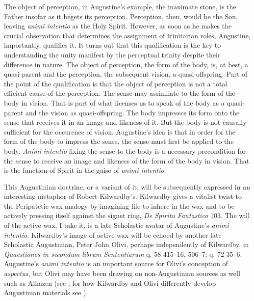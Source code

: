 \documentclass[12pt]{article}
\begin{document}
The object of perception, in Augustine's example, the inanimate stone, is the Father insofar as it begets its perception. Perception, then, would be the Son, leaving \emph{animi intentio} as the Holy Spirit. However, as soon as he makes the crucial observation that determines the assignment of trinitarian roles, Augustine, importantly, qualifies it. It turns out that this qualification is the key to understanding the unity manifest by the perceptual trinity despite their difference in nature. The object of perception, the form of the body, is, at best, a quasi-parent and the perception, the subsequent vision, a quasi-offspring. Part of the point of the qualification is that the object of perception is not a total efficient cause of the perception. The sense may assimilate to the form of the body in vision. That is part of what licenses us to speak of the body as a quasi-parent and the vision as quasi-offspring. The body impresses its form onto the sense that receives it in an image and likeness of it. But the body is not causally sufficient for the occurence of vision. Augustine's idea is that in order for the form of the body to impress the sense, the sense must first be applied to the body. \emph{Animi intentio} fixing the sense to the body is a necessary precondition for the sense to receive an image and likeness of the form of the body in vision. That is the function of Spirit in the guise of \emph{animi intentio}. 

This Augustinian doctrine, or a variant of it, will be subsequently expressed in an interesting metaphor of Robert Kilwardby's. Kilwardby gives a vitalist twist to the Peripatetic wax analogy by imagining life to inhere in the wax and to be actively pressing itself against the signet ring, \emph{De Spiritu Fantastico} 103. The will of the active wax, I take it, is a late Scholastic avatar of Augustine's \emph{animi intentio}. Kilwardby's image of active wax will be echoed by another late Scholastic Augustinian, Peter John Olivi, perhaps independently of Kilwardby, in \emph{Quaestiones in secondum librum Sententiarum} q. 58 415–16, 506–7; q. 72 35–6. Augustine's \emph{animi intentio} is an important source for Olivi's conception of \emph{aspectus}, but Olivi may have been drawing on non-Augustinian sources as well such as Alhazen (see \citealt[41 especially n. 43]{Tachau:1988aa}; for how Kilwardby and Olivi differently develop Augustinian materials see \citealt{Silva:2010zh}). 
\end{document}
